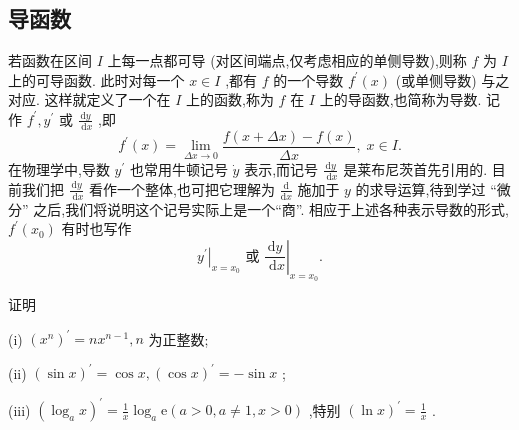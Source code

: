 \subsection{导函数}

若函数在区间 \(I\) 上每一点都可导 (对区间端点,仅考虑相应的单侧导数),则称 \(f\) 为 \(I\) 上的可导函数. 此时对每一个 \(x \in  I\) ,都有 \(f\) 的一个导数 \({f}^{\prime }\left( x\right)\) (或单侧导数) 与之对应. 这样就定义了一个在 \(I\) 上的函数,称为 \(f\) 在 \(I\) 上的导函数,也简称为导数. 记作 \({f}^{\prime },{y}^{\prime }\) 或 \(\frac{\mathrm{d}y}{\mathrm{\;d}x}\) ,即
\[
{f}^{\prime }\left( x\right)  = \mathop{\lim }\limits_{{{\Delta x} \rightarrow  0}}\frac{f\left( {x + {\Delta x}}\right)  - f\left( x\right) }{\Delta x},\;x \in  I.
\]
在物理学中,导数 \({y}^{\prime }\) 也常用牛顿记号 \(\dot{y}\) 表示,而记号 \(\frac{\mathrm{d}y}{\mathrm{\;d}x}\) 是莱布尼茨首先引用的. 目前我们把 \(\frac{\mathrm{d}y}{\mathrm{\;d}x}\) 看作一个整体,也可把它理解为 \(\frac{\mathrm{d}}{\mathrm{d}x}\) 施加于 \(y\) 的求导运算,待到学过 “微分” 之后,我们将说明这个记号实际上是一个“商”. 相应于上述各种表示导数的形式, \({f}^{\prime }\left( {x}_{0}\right)\) 有时也写作
\[
{\left. {y}^{\prime }\right| }_{x = {x}_{0}}\text{ 或 }{\left. \frac{\mathrm{d}y}{\mathrm{\;d}x}\right| }_{x = {x}_{0}}.
\]
\begin{example}
证明

(i) \({\left( {x}^{n}\right) }^{\prime } = n{x}^{n - 1},n\) 为正整数;

(ii) \({\left( \sin x\right) }^{\prime } = \cos x,{\left( \cos x\right) }^{\prime } =  - \sin x\) ;

(iii) \({\left( {\log }_{a}x\right) }^{\prime } = \frac{1}{x}{\log }_{a}\mathrm{e}\left( {a > 0,a \neq  1,x > 0}\right)\) ,特别 \({\left( \ln x\right) }^{\prime } = \frac{1}{x}\) .
\end{example}


